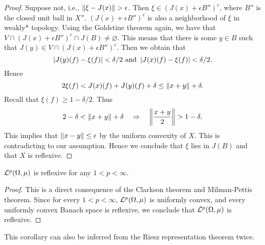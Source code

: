 \begin{proof}
    Suppose not, i.e., $\left\lVert {\xi - J(x)} \right\rVert > \epsilon$. Then 
    $\xi\in (J(x) + \epsilon B'')^c$, where $B''$ is the closed unit ball in $X''$. 
    $(J(x) + \epsilon B'')^c$ is also a neighborhood of $\xi$ in weakly* topology. 
    Using the Goldstine theorem again, we have that $V\cap(J(x) + \epsilon B'')^c\cap 
    J(B)\neq\varnothing$. This means that there is some $y\in B$ such that 
    $J(y)\in V\cap(J(x) + \epsilon B'')^c$. Then we obtain that 
    \begin{equation*}
        \left\lvert {J(y)(f) - \xi(f)} \right\rvert < \delta/2 \text{ and } \left\lvert {J(x)(f) - \xi(f)} \right\rvert < \delta/2.
    \end{equation*}
    Hence 
    \begin{equation*}
        2\xi(f) < J(x)(f) + J(y)(f) + \delta \leq \left\lVert {x+y} \right\rVert + \delta.
    \end{equation*}
    Recall that $\xi(f)\geq 1-\delta/2$. Thus 
    \begin{equation*}
        2-\delta < \left\lVert {x+y} \right\rVert + \delta\quad\Rightarrow\quad 
        \left\lVert {\frac{x+y}{2}} \right\rVert > 1-\delta.
    \end{equation*}
    This implies that $\left\lVert {x-y} \right\rVert\leq\epsilon$ by the uniform convexity of $X$. 
    This is contradicting to our assumption. Hence we conclude that 
    $\xi$ lies in $J(B)$ and that $X$ is reflexive. 
\end{proof}

\begin{corollary}
    $\mathcal{L}^p(\Omega,\mu)$ is reflexive for any $1< p <\infty$.
\end{corollary}
\begin{proof}
    This is a direct consequence of the Clarkson theorem and 
    Milman-Pettis theorem. Since for every $1<p<\infty$, 
    $\mathcal{L}^p(\Omega,\mu)$ is uniformly convex, and every uniformly 
    convex Banach space is reflexive, we conclude that 
    $\mathcal{L}^p(\Omega,\mu)$ is reflexive.
\end{proof}
\begin{remark}
    This corollary can also be inferred from the Riesz 
    representation theorem twice. 
\end{remark}

